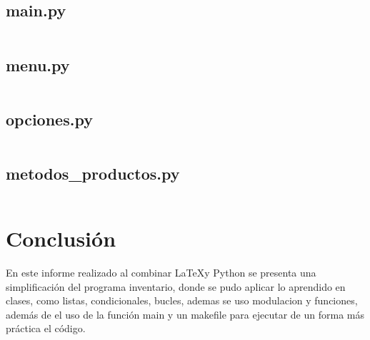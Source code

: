 \documentclass[12pt]{article}
\begin{document}
\subsection{main.py}
\inputminted[fontsize=\small, breaklines=true]{python}{Codigo/main.py}

\subsection{menu.py}
\inputminted[fontsize=\small, breaklines=true]{python}{Codigo/menu.py}

\subsection{opciones.py}
\inputminted[fontsize=\small, breaklines=true]{python}{Codigo/opciones.py}

\subsection{metodos\_productos.py}
\inputminted[fontsize=\small, breaklines=true]{python}{Codigo/metodos_productos.py}

\section{Conclusión}

En este informe realizado al combinar \LaTeX y Python se presenta una simplificación del programa inventario, donde se pudo aplicar lo aprendido en clases, como listas, condicionales, bucles, ademas se uso modulacion y funciones, además de el uso de la función main y un makefile para ejecutar de un forma más práctica el código.
\end{document}
